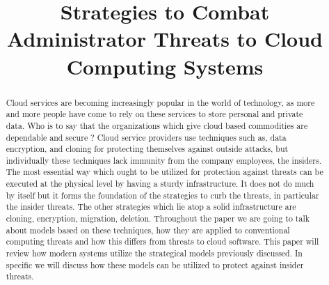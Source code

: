 \documentclass[conference]{IEEEtran}
\begin{document}
\title{Strategies to Combat Administrator Threats to Cloud Computing Systems}
\author{
  \and
}

\maketitle

\begin{abstract}
  Cloud services are becoming increasingly popular in the world of technology, as more and more people have come to rely on these services to store personal and private data. Who is to say that the organizations which give cloud based commodities are dependable and secure ? Cloud service providers use techniques such as, data encryption, and cloning for protecting themselves against outside attacks, but individually these techniques lack immunity from the company employees, the insiders. The most essential way which ought to be utilized for protection against threats can be executed at the physical level by having a sturdy infrastructure. It does not do much by itself but it forms the foundation of the strategies to curb the threats, in particular the insider threats. The other strategies which lie atop a solid infrastructure are cloning, encryption, migration, deletion. Throughout the paper we are going to talk about models based on these techniques, how they are applied to conventional computing threats and how this differs from threats to cloud software. This paper will review how modern systems utilize the strategical models previously discussed. In specific we will discuss how these models can be utilized to protect against insider threats.
\end{abstract}

\IEEEpeerreviewmaketitle










\end{document}
